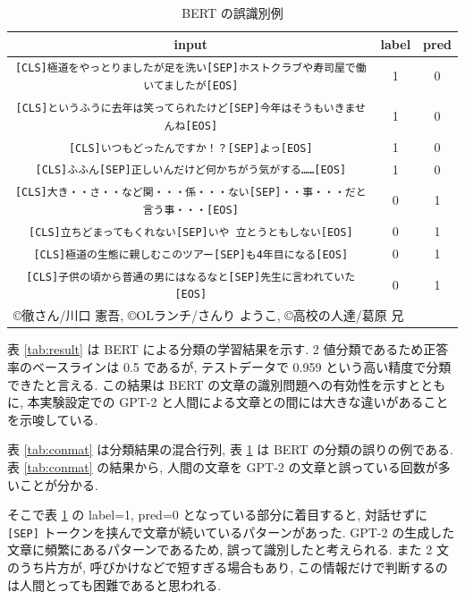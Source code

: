 \documentclass[twocolumn]{jarticle}     %
\begin{document}
\begin{table}[tb]
  \begin{center}
    \caption{BERT の誤識別例}
    \begin{tabular}{ccc}
      \hline
      input & label & pred \\
      \hline
      \verb|[CLS]極道をやっとりましたが足を洗い[SEP]ホストクラブや寿司屋で働いてましたが[EOS]| & 1 & 0 \\
      \verb|[CLS]というふうに去年は笑ってられたけど[SEP]今年はそうもいきませんね[EOS]| & 1 & 0 \\
      \verb|[CLS]いつもどったんですか！？[SEP]よっ[EOS]| & 1 & 0 \\
      \verb|[CLS]ふふん[SEP]正しいんだけど何かちがう気がする……[EOS]| & 1 & 0 \\
      \verb|[CLS]大き・・さ・・など関・・・係・・・ない[SEP]・・事・・・だと言う事・・・[EOS]| & 0 & 1 \\
      \verb|[CLS]立ちどまってもくれない[SEP]いや 立とうともしない[EOS]| & 0 & 1 \\
      \verb|[CLS]極道の生態に親しむこのツアー[SEP]も4年目になる[EOS]| & 0 & 1 \\
      \verb|[CLS]子供の頃から普通の男にはなるなと[SEP]先生に言われていた[EOS]| & 0 & 1 \\
      \hline
      \multicolumn{3}{l}{©徹さん/川口 憲吾,   ©OLランチ/さんり ようこ,  ©高校の人達/葛原 兄}
    \end{tabular}
    \label{tab:bert_result}
  \end{center}
\end{table}

表 \ref{tab:result} は BERT による分類の学習結果を示す.
2 値分類であるため正答率のベースラインは 0.5 であるが, テストデータで 0.959 という高い精度で分類できたと言える.
この結果は BERT の文章の識別問題への有効性を示すとともに, 本実験設定での GPT-2 と人間による文章との間には大きな違いがあることを示唆している.



表 \ref{tab:conmat} は分類結果の混合行列,
表 \ref{tab:bert_result} は BERT の分類の誤りの例である.
表 \ref{tab:conmat} の結果から, 人間の文章を GPT-2 の文章と誤っている回数が多いことが分かる.

そこで表 \ref{tab:bert_result} の label=1, pred=0 となっている部分に着目すると,
対話せずに \verb|[SEP]| トークンを挟んで文章が続いているパターンがあった.
GPT-2 の生成した文章に頻繁にあるパターンであるため, 誤って識別したと考えられる.
また 2 文のうち片方が, 呼びかけなどで短すぎる場合もあり, この情報だけで判断するのは人間とっても困難であると思われる.
\end{document}
